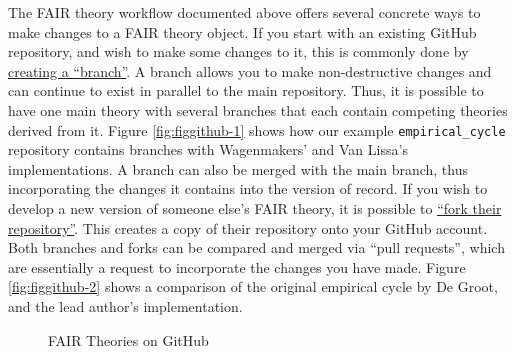 \documentclass[
  man, noextraspace,floatsintext]{apa7}
\begin{document}
The FAIR theory workflow documented above offers several concrete ways to make changes to a FAIR theory object.
If you start with an existing GitHub repository, and wish to make some changes to it,
this is commonly done by \href{https://docs.github.com/en/pull-requests/collaborating-with-pull-requests/proposing-changes-to-your-work-with-pull-requests/creating-and-deleting-branches-within-your-repository}{creating a ``branch''}.
A branch allows you to make non-destructive changes and can continue to exist in parallel to the main repository.
Thus, it is possible to have one main theory with several branches that each contain competing theories derived from it.
Figure \ref{fig:figgithub-1} shows how our example \texttt{empirical\_cycle} repository contains branches with Wagenmakers' and Van Lissa's implementations.
A branch can also be merged with the main branch, thus incorporating the changes it contains into the version of record.
If you wish to develop a new version of someone else's FAIR theory,
it is possible to \href{https://docs.github.com/en/pull-requests/collaborating-with-pull-requests/working-with-forks/fork-a-repo}{``fork their repository''}.
This creates a copy of their repository onto your GitHub account.
Both branches and forks can be compared and merged via ``pull requests'', which are essentially a request to incorporate the changes you have made.
Figure \ref{fig:figgithub-2} shows a comparison of the original empirical cycle by De Groot, and the lead author's implementation.

\begin{figure}
\caption{FAIR Theories on GitHub}\label{fig:figgithub}
\end{figure}
\end{document}
